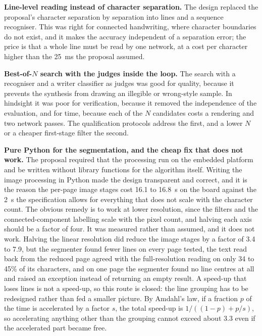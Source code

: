         \textbf{Line-level reading instead of character separation.}
        The design replaced the proposal's character separation by separation into lines and a sequence recogniser.
        This was right for connected handwriting, where character boundaries do not exist, and it makes the accuracy independent of a separation error; the price is that a whole line must be read by one network, at a cost per character higher than the 25~ms the proposal assumed.

        \textbf{Best-of-$N$ search with the judges inside the loop.}
        The search with a recogniser and a writer classifier as judges was good for quality, because it prevents the synthesis from drawing an illegible or wrong-style sample.
        In hindsight it was poor for verification, because it removed the independence of the evaluation, and for time, because each of the $N$ candidates costs a rendering and two network passes.
        The qualification protocols address the first, and a lower $N$ or a cheaper first-stage filter the second.

        \textbf{Pure Python for the segmentation, and the cheap fix that does not work.}
        The proposal required that the processing run on the embedded platform and be written without library functions for the algorithm itself.
        Writing the image processing in Python made the design transparent and correct, and it is the reason the per-page image stages cost 16.1 to 16.8~s on the board against the 2~s the specification allows for everything that does not scale with the character count.
        The obvious remedy is to work at lower resolution, since the filters and the connected-component labelling scale with the pixel count, and halving each axis should be a factor of four.
        It was measured rather than assumed, and it does not work.
        Halving the linear resolution did reduce the image stages by a factor of 3.4 to 7.9, but the segmenter found fewer lines on every page tested, the text read back from the reduced page agreed with the full-resolution reading on only 34 to 45\% of its characters, and on one page the segmenter found no line centres at all and raised an exception instead of returning an empty result.
        A speed-up that loses lines is not a speed-up, so this route is closed: the line grouping has to be redesigned rather than fed a smaller picture.
        By Amdahl's law, if a fraction $p$ of the time is accelerated by a factor $s$, the total speed-up is $1/((1-p)+p/s)$, so accelerating anything other than the grouping cannot exceed about $3.3$ even if the accelerated part became free.

